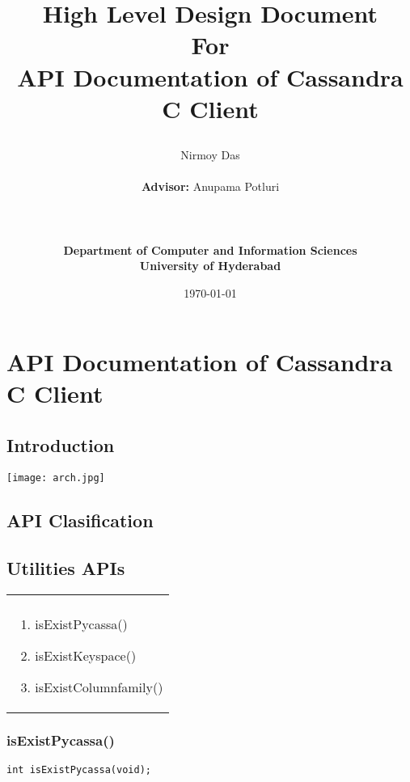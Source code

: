 \documentclass[12 pt , a4paper ]{report}
\newcommand{\university}{\large{\bf University of Hyderabad}}
\newcommand{\projectname}{API Documentation of Cassandra C Client}
\newcommand{\department}{\large{\bf{Department of Computer and Information Sciences}}}
\begin{document}
\title{\bf{ High Level Design Document \\ For\\ \bf{\projectname} \\ \documentversion }
\author{Nirmoy Das \\ \\ {\bf{Advisor:}} \large{Anupama Potluri} \date{\today} \\ \\ \\ \department \\ \university }}
\tableofcontents
\chapter{API Documentation of Cassandra C Client}
\section{Introduction}
\texttt{[image: arch.jpg]}

 
\section{API Clasification} 


\section{Utilities APIs} 



 \begin{tabular}{p{7cm}}
  \cellcolor{blue!25}{\bf Utilities APIs } \\
  \cellcolor{blue!25}
\begin{enumerate}
\item isExistPycassa()
   \item isExistKeyspace()
   \item isExistColumnfamily()

   \end{enumerate} 
 \end{tabular}
\subsection{isExistPycassa()}
\begin{verbatim}
int isExistPycassa(void);
\end{verbatim}
\end{document}
